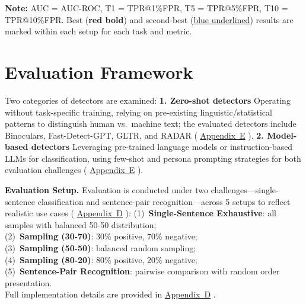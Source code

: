 \documentclass[runningheads]{llncs}
\newcommand{\appref}[1]{%
  \href{https://github.com/JonathanZha47/PadBen-Paraphrase-Attack-Benchmark/blob/main/docs/padben_icann_appendix.pdf}{Appendix~#1}%
}
\begin{document}
\begin{table}[t]
{\begin{tabular}{lll|cccc|cccc|cccc|cccc|cccc}
\bottomrule
\end{tabular}%
}
{\raggedright\small\textbf{Note:} AUC = AUC-ROC, T1 = TPR@1\%FPR, T5 = TPR@5\%FPR, T10 = TPR@10\%FPR. Best ({\color{red}\textbf{red bold}}) and second-best ({\color{blue}\underline{blue underlined}}) results are marked within each setup for each task and metric.\par}
\end{table}
\section{Evaluation Framework}
Two categories of detectors are examined: \textbf{1. Zero-shot detectors} 
Operating without task-specific training, relying on pre-existing 
linguistic/statistical patterns to distinguish human vs.\ machine text; 
the evaluated detectors include Binoculars, Fast-Detect-GPT, GLTR, and 
RADAR (\appref{E}). \textbf{2. Model-based 
detectors} Leveraging pre-trained language models or instruction-based 
LLMs for classification, using few-shot and persona prompting strategies 
for both evaluation challenges 
(\appref{E}).

\noindent\textbf{Evaluation Setup.}
Evaluation is conducted under two challenges---single-sentence 
classification and sentence-pair recognition---across 5 setups to 
reflect realistic use cases (\appref{D}): (1)~\textbf{Single-Sentence 
Exhaustive}: all samples with balanced 50-50 distribution; \\
(2)~\textbf{Sampling (30-70)}: 30\% positive, 70\% negative; \\
(3)~\textbf{Sampling (50-50)}: balanced random sampling; \\
(4)~\textbf{Sampling (80-20)}: 80\% positive, 20\% negative; \\
(5)~\textbf{Sentence-Pair Recognition}: pairwise comparison with 
random order presentation. \\
Full implementation details are provided 
in \appref{D}.
\end{document}
